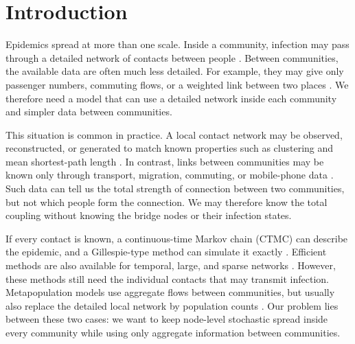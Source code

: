 \begingroup\color{black}
\hypersetup{citecolor=black,linkcolor=black}

\section{Introduction}
\label{sec:introduction}

Epidemics spread at more than one scale. Inside a community, infection may pass through a detailed network of contacts between people \citep{keeling2005,pastorsatorras2015,kiss2017}. Between communities, the available data are often much less detailed. For example, they may give only passenger numbers, commuting flows, or a weighted link between two places \citep{balcan2009,barbosa2018human}. We therefore need a model that can use a detailed network inside each community and simpler data between communities.

This situation is common in practice. A local contact network may be observed, reconstructed, or generated to match known properties such as clustering and mean shortest-path length \citep{eubank2004,danon2011}. In contrast, links between communities may be known only through transport, migration, commuting, or mobile-phone data \citep{barbosa2018human,chang2021}. Such data can tell us the total strength of connection between two communities, but not which people form the connection. We may therefore know the total coupling without knowing the bridge nodes or their infection states.

If every contact is known, a continuous-time Markov chain (CTMC) can describe the epidemic, and a Gillespie-type method can simulate it exactly \citep{gillespie1977exact,gibson2000}. Efficient methods are also available for temporal, large, and sparse networks \citep{vestergaard2015,kuryliak2025simulating}. However, these methods still need the individual contacts that may transmit infection. Metapopulation models use aggregate flows between communities, but usually also replace the detailed local network by population counts \citep{colizza2007reaction,colizza2008,balcan2010modeling,ajelli2010}. Our problem lies between these two cases: we want to keep node-level stochastic spread inside every community while using only aggregate information between communities.

